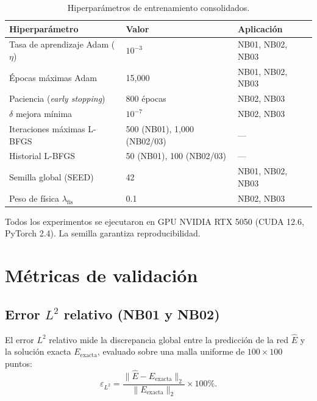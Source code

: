 \begin{table}[htbp]
\centering
\begin{threeparttable}
\caption{Hiperparámetros de entrenamiento consolidados.}
\label{tab:hiperparametros}
\begin{tabular}{lll}
\toprule
Hiperparámetro & Valor & Aplicación \\
\midrule
Tasa de aprendizaje Adam ($\eta$) & $10^{-3}$ & NB01, NB02, NB03 \\
Épocas máximas Adam             & 15{,}000  & NB01, NB02, NB03 \\
Paciencia (\textit{early stopping}) & 800 épocas & NB02, NB03 \\
$\delta$ mejora mínima          & $10^{-7}$ & NB02, NB03 \\
Iteraciones máximas L-BFGS      & 500 (NB01), 1{,}000 (NB02/03) & — \\
Historial L-BFGS                & 50 (NB01), 100 (NB02/03) & — \\
Semilla global (SEED)           & 42        & NB01, NB02, NB03 \\
Peso de física $\lambda_\text{fís}$ & 0.1  & NB02, NB03 \\
\bottomrule
\end{tabular}
\begin{tablenotes}\small
    \item Todos los experimentos se ejecutaron en GPU NVIDIA RTX 5050
    (CUDA 12.6, PyTorch 2.4). La semilla garantiza reproducibilidad.
\end{tablenotes}
\end{threeparttable}
\end{table}

\section{Métricas de validación}

\subsection{Error $L^2$ relativo (NB01 y NB02)}

El error $L^2$ relativo mide la discrepancia global entre la predicción de la
red $\hat{E}$ y la solución exacta $E_\text{exacta}$, evaluado sobre una malla
uniforme de $100 \times 100$ puntos:
%
\begin{equation}
    \varepsilon_{L^2} = \frac{\|\hat{E} - E_\text{exacta}\|_2}
    {\|E_\text{exacta}\|_2} \times 100\%.
    \label{eq:l2}
\end{equation}

